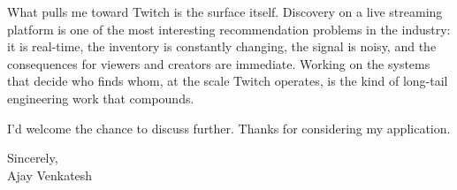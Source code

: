 \documentclass[letterpaper,11pt]{article}
\begin{document}
What pulls me toward Twitch is the surface itself. Discovery on a live streaming platform is one of the most interesting recommendation problems in the industry: it is real-time, the inventory is constantly changing, the signal is noisy, and the consequences for viewers and creators are immediate. Working on the systems that decide who finds whom, at the scale Twitch operates, is the kind of long-tail engineering work that compounds.

I'd welcome the chance to discuss further. Thanks for considering my application.

\vspace{12pt}
Sincerely, \\
Ajay Venkatesh
\end{document}
